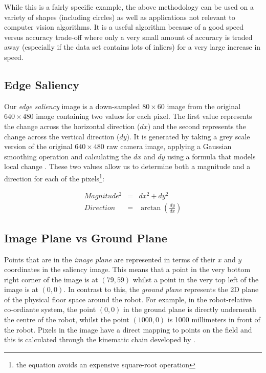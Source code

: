 \documentclass{article}
\begin{document}
While this is a fairly specific example, the above methodology can be used on a variety of shapes (including circles) as well as applications not relevant to computer vision algorithms. It is a useful algorithm because of a good speed versus accuracy trade-off where only a very small amount of accuracy is traded away (especially if the data set contains lots of inliers) for a very large increase in speed.


\subsection{Edge Saliency}
Our \emph{edge saliency} image is a down-sampled $80 \times 60$ image from the original $640 \times 480$ image containing two values for each pixel. The first value represents the change across the horizontal direction ($dx$) and the second represents the change across the vertical direction ($dy$). It is generated by taking a grey scale version of the original $640 \times 480$ raw camera image, applying a Gaussian smoothing operation and calculating the $dx$ and $dy$ using a formula that models local change \cite{chatfield}. These two values allow us to determine both a magnitude and a direction for each of the pixels\footnote{the equation avoids an expensive square-root operation}:

\begin{eqnarray}
Magnitude^2 &=& dx^2 + dy^2\\
Direction &=& \arctan(\frac{dy}{dx})
\end{eqnarray}


\subsection{Image Plane vs Ground Plane}
Points that are in the \emph{image plane} are represented in terms of their $x$ and $y$ coordinates in the saliency image. This means that a point in the very bottom right corner of the image is at $(79, 59)$ whilst a point in the very top left of the image is at $(0,0)$. In contrast to this, the \emph{ground plane} represents the 2D plane of the physical floor space around the robot. For example, in the robot-relative co-ordiante system, the point $(0,0)$ in the ground plane is directly underneath the centre of the robot, whilst the point $(1000, 0)$ is 1000 millimeters in front of the robot. Pixels in the image have a direct mapping to points on the field and this is calculated through the kinematic chain developed by \citeauthor{rUNSWift2010} . 
\end{document}
